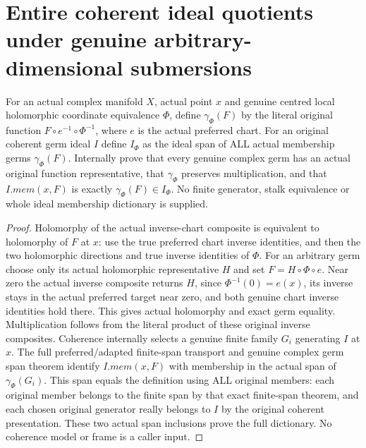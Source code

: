 \section{Entire coherent ideal quotients under genuine arbitrary-dimensional submersions}

\begin{lemma}
\label{hir:submersion-germ-colon-adapted-stalk}
\leanok
For an actual complex manifold $X$, actual point $x$ and genuine centred local
holomorphic coordinate equivalence $\Phi$, define $\gamma_\Phi(F)$ by the
literal original function $F\circ e^{-1}\circ\Phi^{-1}$, where $e$ is the
actual preferred chart. For an original coherent germ ideal $I$ define
$I_\Phi$ as the ideal span of ALL actual membership germs $\gamma_\Phi(F)$.
Internally prove that every genuine complex germ has an actual original
function representative, that $\gamma_\Phi$ preserves multiplication, and
that $I.mem(x,F)$ is exactly $\gamma_\Phi(F)\in I_\Phi$. No finite generator,
stalk equivalence or whole ideal membership dictionary is supplied.
\end{lemma}
\begin{proof}
Holomorphy of the actual inverse-chart composite is equivalent to holomorphy
of $F$ at $x$: use the true preferred chart inverse identities, and then the
two holomorphic directions and true inverse identities of $\Phi$. For an
arbitrary germ choose only its actual holomorphic representative $H$ and set
$F=H\circ\Phi\circ e$. Near zero the actual inverse composite returns $H$,
since $\Phi^{-1}(0)=e(x)$, its inverse stays in the actual preferred target
near zero, and both genuine chart inverse identities hold there. This gives
actual holomorphy and exact germ equality. Multiplication follows from the
literal product of these original inverse composites.
Coherence internally selects a genuine finite family $G_i$ generating $I$
at $x$. The full preferred/adapted finite-span transport and genuine complex
germ span theorem identify $I.mem(x,F)$ with membership in the actual span
of $\gamma_\Phi(G_i)$. This span equals the definition using ALL original
members: each original member belongs to the finite span by that exact
finite-span theorem, and each chosen original generator really belongs to
$I$ by the original coherent presentation. These two actual span inclusions
prove the full dictionary. No coherence model or frame is a caller input.
\end{proof}

